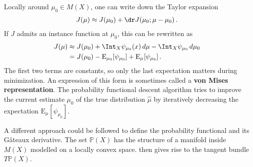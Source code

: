 

    Locally around $\mu_0\in M(X)$, one can write down the Taylor expansion
    \begin{gather*}
        J(\mu)\approx J(\mu_0) + \dr J(\mu_0;\mu-\mu_0)\,.
    \end{gather*}
    If $J$ admits an instance function at $\mu_0$, this can be rewritten as
    \begin{align*}
        J(\mu)&\approx J(\mu_0) + \Int_X\psi_{\mu_0}(x)\,d\mu - \Int_X\psi_{\mu_0}\,d\mu_0\\
        &= J(\mu_0) - \mathrm{E}_{\mu_0}[\psi_{\mu_0}] + \mathrm{E}_\mu[\psi_{\mu_0}]\,.
    \end{align*}
    The first two terms are constants, so only the last expectation matters during minimization. An expression of this form is sometimes called a \textbf{von Mises representation}. The probability functional descent algorithm tries to improve the current estimate $\mu_0$ of the true distribution $\widehat{\mu}$ by iteratively decreasing the expectation $\mathrm{E}_\mu[\psi_{\mu_0}]$.

    A different approach could be followed to define the probability functional and its G\^ateaux derivative. The set $\mathbb{P}(X)$ has the structure of a manifold inside $M(X)$ modelled on a locally convex space.  then gives rise to the tangent bundle $T\mathbb{P}(X)$.

